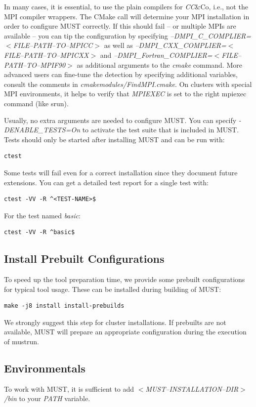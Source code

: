 \documentclass[english]{scrartcl}
\begin{document}
In many cases, it is essential, to use the plain compilers for \emph{CC}\&Co, i.e., not
the MPI compiler wrappers.
The CMake call will determine your MPI installation in order to configure
MUST correctly. If this should fail -- or multiple MPIs are available -- you
can tip the configuration by specifying
\emph{\mbox{--}DMPI\_C\_COMPLIER=$<$FILE\mbox{--}PATH\mbox{--}TO\mbox{--}MPICC$>$} as well as
\emph{\mbox{--}DMPI\_CXX\_COMPLIER=$<$FILE\mbox{--}PATH\mbox{--}TO\mbox{--}MPICXX$>$} and
\emph{\mbox{--}DMPI\_Fortran\_COMPLIER=$<$FILE\mbox{--}PATH\mbox{--}TO\mbox{--}MPIF90$>$} as additional
arguments to the \emph{cmake} command. More advanced users can fine-tune the
detection by specifying additional variables, consult the comments in
\emph{cmakemodules/FindMPI.cmake}. On clusters with special MPI environments, it helps to 
verify that \emph{MPIEXEC} is set to the right mpiexec command (like srun).

Usually, no extra arguments are needed to configure MUST. You can specify
\emph{-DENABLE\_TESTS=On} to activate the test suite that is included in MUST.
Tests should only be started after installing MUST and can be run with:
\begin{verbatim}
ctest
\end{verbatim}
Some tests will fail even for a correct installation since they document
future extensions. You can get a detailed test report for a single test with:
\begin{verbatim}
ctest -VV -R ^<TEST-NAME>$
\end{verbatim}
For the test named \emph{basic}:
\begin{verbatim}
ctest -VV -R ^basic$
\end{verbatim}

\subsection{Install Prebuilt Configurations}
To speed up the tool preparation time, we provide some prebuilt
configurations for typical tool usage. These can be installed during
building of MUST:
\begin{verbatim}
make -j8 install install-prebuilds
\end{verbatim}
We strongly suggest this step for cluster installations.
If prebuilts are not available, MUST will prepare an appropriate
configuration during the execution of mustrun.

\subsection{Environmentals}
To work with MUST, it is sufficient to add \emph{$<$MUST\mbox{--}INSTALLATION\mbox{--}DIR$>$/bin} 
to your \emph{PATH} variable. 
\end{document}
